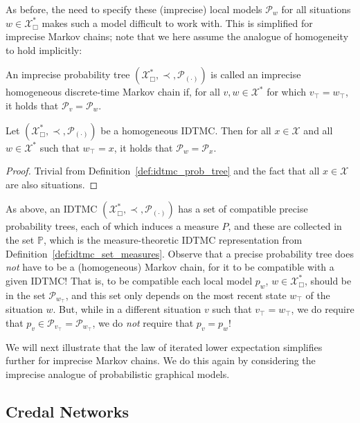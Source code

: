 \documentclass[graybox]{svmult}
\newcommand{\states}{\mathcal{X}}
\begin{document}
As before, the need to specify these (imprecise) local models $\mathcal{P}_w$ for all situations $w\in\states^*_\Box$ makes such a model difficult to work with. This is simplified for imprecise Markov chains; note that we here assume the analogue of homogeneity to hold implicitly:
\begin{definition}\label{def:idtmc_prob_tree}
An imprecise probability tree $(\states^*_\Box,\prec,\mathcal{P}_{(\cdot)})$ is called an imprecise homogeneous discrete-time Markov chain if, for all $v,w\in\states^*$ for which $v_\top=w_\top$, it holds that $\mathcal{P}_v=\mathcal{P}_w$.
\end{definition}
\begin{corollary}
Let $(\states^*_\Box,\prec,\mathcal{P}_{(\cdot)})$ be a homogeneous IDTMC. Then for all $x\in\states$ and all $w\in\states^*$ such that $w_\top=x$, it holds that $\mathcal{P}_w=\mathcal{P}_x$.
\end{corollary}
\begin{proof}
Trivial from Definition~\ref{def:idtmc_prob_tree} and the fact that all $x\in\states$ are also situations.
\end{proof}
As above, an IDTMC $(\states^*_\Box,\prec,\mathcal{P}_{(\cdot)})$ has a set of compatible precise probability trees, each of which induces a measure $P$, and these are collected in the set $\mathbb{P}$, which is the measure-theoretic IDTMC representation from Definition~\ref{def:idtmc_set_measures}. Observe that a precise probability tree does \emph{not} have to be a (homogeneous) Markov chain, for it to be compatible with a given IDTMC! That is, to be compatible each local model $p_w$, $w\in\states^*_\Box$, should be in the set $\mathcal{P}_{w_\top}$, and this set only depends on the most recent state $w_\top$ of the situation $w$. But, while in a different situation $v$ such that $v_\top=w_\top$, we do require that $p_v\in\mathcal{P}_{v_\top}=\mathcal{P}_{w_\top}$, we do \emph{not} require that $p_v=p_w$!

We will next illustrate that the law of iterated lower expectation simplifies further for imprecise Markov chains. We do this again by considering the imprecise analogue of probabilistic graphical models.

\subsection{Credal Networks}\label{sec:credal_net}
\end{document}
